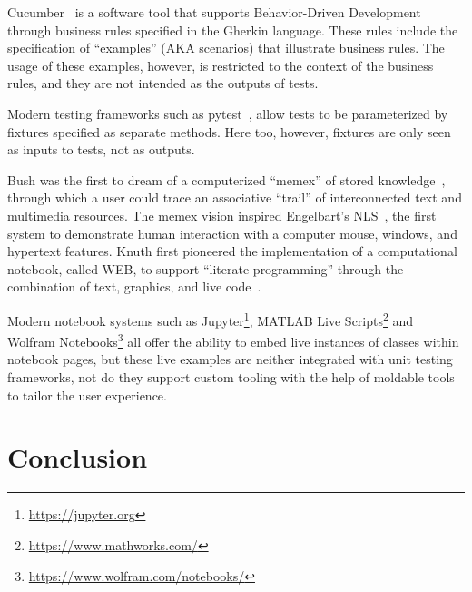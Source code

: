 \documentclass[sigplan,anonymous,review,10pt]{acmart}
\begin{document}
Cucumber~\cite{Hell17a} is a software tool that supports Behavior-Driven Development through business rules specified in the Gherkin language.
These rules include the specification of ``examples'' (AKA scenarios) that illustrate business rules.
The usage of these examples, however, is restricted to the context of the business rules, and they are not intended as the outputs of tests.

Modern testing frameworks such as pytest~\cite{Okke22a}, allow tests to be parameterized by fixtures specified as separate methods.
Here too, however, fixtures are only seen as inputs to tests, not as outputs.

Bush was the first to dream of a computerized ``memex'' of stored knowledge~\cite{Bush45a}, through which a user could trace an associative ``trail'' of interconnected text and multimedia resources.
The memex vision inspired Engelbart's NLS~\cite{Enge68a}, the first system to demonstrate human interaction with a computer mouse, windows, and hypertext features.
Knuth first pioneered the implementation of a computational notebook, called WEB, to support ``literate programming'' through the combination of text, graphics, and live code~\cite{Knut97a}.

Modern notebook systems such as Jupyter\footnote{\url{https://jupyter.org}}, MATLAB Live Scripts\footnote{\url{https://www.mathworks.com/}} and Wolfram Notebooks\footnote{\url{https://www.wolfram.com/notebooks/}} all offer the ability to embed live instances of classes within notebook pages, but these live examples are neither integrated with unit testing frameworks, not do they support custom tooling with the help of moldable tools to tailor the user experience.

\section{Conclusion}\label{sec:conclusion}









\end{document}
